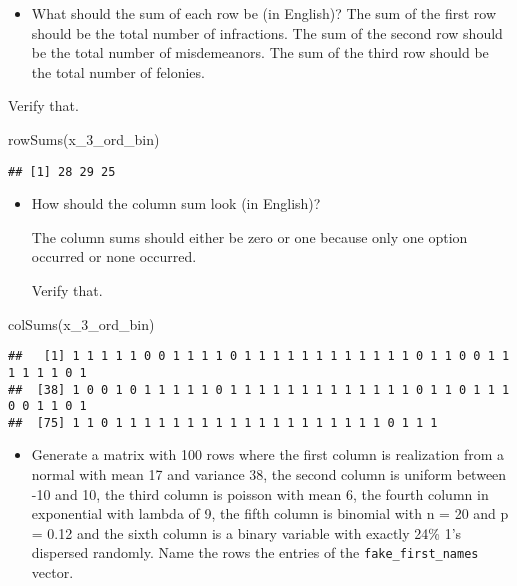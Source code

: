\documentclass[
]{article}
\newenvironment{Shaded}{\begin{snugshade}}{\end{snugshade}}
\newcommand{\FunctionTok}[1]{\textcolor[rgb]{0.00,0.00,0.00}{#1}}
\newcommand{\NormalTok}[1]{#1}
\providecommand{\tightlist}{%
  \setlength{\itemsep}{0pt}\setlength{\parskip}{0pt}}
\begin{document}
\begin{itemize}
\tightlist
\item
  What should the sum of each row be (in English)? The sum of the first
  row should be the total number of infractions. The sum of the second
  row should be the total number of misdemeanors. The sum of the third
  row should be the total number of felonies.
\end{itemize}

Verify that.

\begin{Shaded}
\begin{Highlighting}[]
\FunctionTok{rowSums}\NormalTok{(x\_3\_ord\_bin)}
\end{Highlighting}
\end{Shaded}

\begin{verbatim}
## [1] 28 29 25
\end{verbatim}

\begin{itemize}
\item
  How should the column sum look (in English)?

  The column sums should either be zero or one because only one option
  occurred or none occurred.

  Verify that.
\end{itemize}

\begin{Shaded}
\begin{Highlighting}[]
\FunctionTok{colSums}\NormalTok{(x\_3\_ord\_bin)}
\end{Highlighting}
\end{Shaded}

\begin{verbatim}
##   [1] 1 1 1 1 1 0 0 1 1 1 1 0 1 1 1 1 1 1 1 1 1 1 1 1 0 1 1 0 0 1 1 1 1 1 1 0 1
##  [38] 1 0 0 1 0 1 1 1 1 1 0 1 1 1 1 1 1 1 1 1 1 1 1 1 0 1 1 0 1 1 1 0 0 1 1 0 1
##  [75] 1 1 0 1 1 1 1 1 1 1 1 1 1 1 1 1 1 1 1 1 1 1 0 1 1 1
\end{verbatim}

\begin{itemize}
\tightlist
\item
  Generate a matrix with 100 rows where the first column is realization
  from a normal with mean 17 and variance 38, the second column is
  uniform between -10 and 10, the third column is poisson with mean 6,
  the fourth column in exponential with lambda of 9, the fifth column is
  binomial with n = 20 and p = 0.12 and the sixth column is a binary
  variable with exactly 24\% 1's dispersed randomly. Name the rows the
  entries of the \texttt{fake\_first\_names} vector.
\end{itemize}
\end{document}
